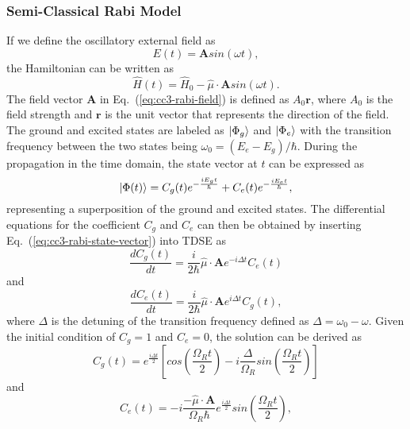 \subsubsection{Semi-Classical Rabi Model} \label{theory-cc3-31}
If we define the oscillatory external field as 
\begin{equation}
E(t) = \textbf{A}sin(\omega t),
\label{eq:cc3-rabi-field}
\end{equation}
the Hamiltonian can be written as
\begin{equation}
\hat{H}(t) = \hat{H}_{0} - \hat{\mu} \cdot \textbf{A}sin(\omega t).
\end{equation}
The field vector $ \textbf{A}$ in Eq.~(\ref{eq:cc3-rabi-field}) is defined as $A_{0}\textbf{r}$, where $A_{0}$ is the field strength and $\textbf{r}$ is the unit vector that represents the direction of the field. The ground and excited states are labeled as $| \Phi_{g} \rangle$ and $| \Phi_{e} \rangle$ with the transition frequency between the two states being $\omega_{0} = (E_{e} - E_{g})/\hbar$. During the propagation in the time domain, the state vector at $t$ can be expressed as
\begin{equation}
| \Phi(t) \rangle = C_{g}(t)e^{-\frac{iE_{g}t}{\hbar}} + C_{e}(t)e^{-\frac{iE_{e}t}{\hbar}},
\label{eq:cc3-rabi-state-vector}
\end{equation}
representing a superposition of the ground and excited states. The differential equations for the coefficient $C_{g}$ and $C_{e}$ can then be obtained by inserting Eq.~(\ref{eq:cc3-rabi-state-vector}) into TDSE as
\begin{equation}
\frac{dC_{g}(t)}{dt} = \frac{i}{2\hbar} \hat{\mu} \cdot  \textbf{A} e^{-i\Delta t} C_{e}(t)
\end{equation}
and
\begin{equation}
\frac{dC_{e}(t)}{dt} = \frac{i}{2\hbar} \hat{\mu} \cdot  \textbf{A} e^{i\Delta t} C_{g}(t),
\end{equation}
where $\Delta$ is the detuning of the transition frequency defined as $\Delta = \omega_{0} - \omega$. 
Given the initial condition of $C_{g} =1$ and $C_{e} =0$, the solution can be derived as 
\begin{equation}
C_{g}(t) =  e^{\frac{i \Delta t}{2}}[cos(\frac{\Omega_{R}t}{2}) - i \frac{\Delta}{\Omega_{R}} sin(\frac{\Omega_{R}t}{2})]
\end{equation}
and
\begin{equation}
C_{e}(t) = -i\frac{-\hat{\mu} \cdot \textbf{A}}{\Omega_{R} \hbar} e^{\frac{i \Delta t}{2}} sin(\frac{\Omega_{R}t}{2}),
\end{equation}
